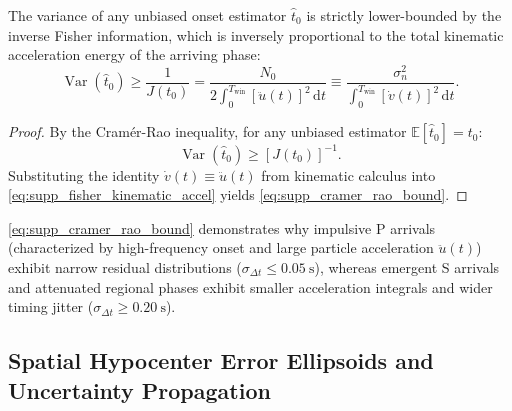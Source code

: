 \begin{theorem}
  \label{thm:supp_cramer_rao}
  The variance of any unbiased onset estimator $\hat{t}_0$ is
  strictly lower-bounded
  by the inverse Fisher information, which is inversely proportional
  to the total kinematic
  acceleration energy of the arriving phase:
  \begin{equation}
    \operatorname{Var}(\hat{t}_0) \ge \frac{1}{J(t_0)}
    = \frac{N_0}{2 \displaystyle\int_0^{T_{\mathrm{win}}} \left[
    \ddot{u}(t) \right]^2 \,\mathrm{d}t}
    \equiv \frac{\sigma_n^2}{\displaystyle\int_0^{T_{\mathrm{win}}}
    \left[ \dot{v}(t) \right]^2 \,\mathrm{d}t}.
    \label{eq:supp_cramer_rao_bound}
  \end{equation}
\end{theorem}

\begin{proof}
  By the Cramér-Rao inequality, for any unbiased estimator
  $\mathbb{E}[\hat{t}_0] = t_0$:
  \begin{equation}
    \operatorname{Var}(\hat{t}_0) \ge [J(t_0)]^{-1}.
  \end{equation}
  Substituting the identity $\dot{v}(t) \equiv \ddot{u}(t)$ from
  kinematic calculus into
  \cref{eq:supp_fisher_kinematic_accel} yields \cref{eq:supp_cramer_rao_bound}.
\end{proof}

\begin{remark}
  \cref{eq:supp_cramer_rao_bound} demonstrates why impulsive P
  arrivals (characterized by
    high-frequency onset and large particle acceleration
  $\ddot{u}(t)$) exhibit narrow
  residual distributions ($\sigma_{\Delta t} \le
  \qty{0.05}{\second}$), whereas emergent
  S arrivals and attenuated regional phases exhibit smaller
  acceleration integrals and
  wider timing jitter ($\sigma_{\Delta t} \ge \qty{0.20}{\second}$).
\end{remark}


\subsection*{Spatial Hypocenter Error Ellipsoids and Uncertainty Propagation}
\label{subsec:supp_spatial_ellipsoid}

